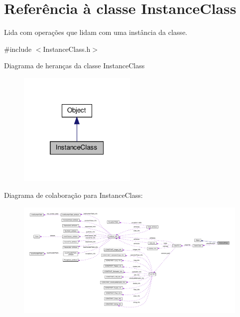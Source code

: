 \hypertarget{classInstanceClass}{}\section{Referência à classe Instance\+Class}
\label{classInstanceClass}


Lida com operações que lidam com uma instância da classe.  




{\ttfamily \#include $<$Instance\+Class.\+h$>$}



Diagrama de heranças da classe Instance\+Class\nopagebreak
\begin{figure}[H]
\begin{center}
\leavevmode
\includegraphics[width=160pt]{classInstanceClass__inherit__graph}
\end{center}
\end{figure}


Diagrama de colaboração para Instance\+Class\+:\nopagebreak
\begin{figure}[H]
\begin{center}
\leavevmode
\includegraphics[width=350pt]{classInstanceClass__coll__graph}
\end{center}
\end{figure}
